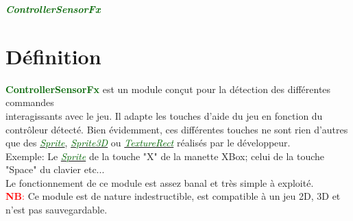 \documentclass[a4paper, 11pt]{article}
\begin{document}
	\pagecolor{silver}
	\huge{\hspace{12cm}\textit{\textbf{\textcolor{darkgreen}{ControllerSensorFx}}}}\large{}
	\tableofcontents \newpage
	\section{Définition}
	\textcolor{darkgreen}{\textbf{ControllerSensorFx}} est un module conçut pour la détection des 
	différentes commandes \\interagissants avec le jeu. Il adapte les touches d'aide du jeu en fonction du 
	contrôleur détecté. Bien évidemment, ces différentes touches ne sont rien d'autres que des
	\href{https://docs.godotengine.org/en/stable/classes/class_sprite.html}
	{\textit{\textcolor{darkgreen}{Sprite}}},
	\href{https://docs.godotengine.org/en/stable/classes/class_sprite3d.html}
	{\textit{\textcolor{darkgreen}{Sprite3D}}} ou
	\href{https://docs.godotengine.org/en/stable/classes/class_texturerect.html}
	{\textit{\textcolor{darkgreen}{TextureRect}}} réalisés par le développeur. \\Exemple: Le 
	\href{https://docs.godotengine.org/en/stable/classes/class_sprite.html}
	{\textit{\textcolor{darkgreen}{Sprite}}} de la touche "X" de la manette XBox; celui de la touche "Space" 
	du clavier etc... \\Le fonctionnement de ce module est assez banal et très simple à exploité.\\
	\textcolor{red}{\textbf{NB}:} Ce module est de nature indestructible, est compatible à un jeu 2D, 3D et 
	n'est pas sauvegardable.

\end{document}
